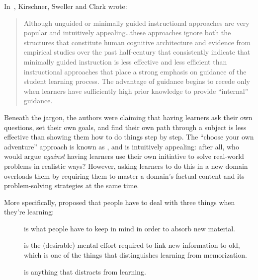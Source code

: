 
In~\cite{Kirs2006}, Kirschner, Sweller and Clark wrote:

\begin{quote}

  Although unguided or minimally guided instructional approaches
  are very popular and intuitively appealing{\ldots}these approaches ignore
  both the structures that constitute human cognitive architecture
  and evidence from empirical studies over the past half-century
  that consistently indicate that minimally guided instruction is less effective and less efficient
  than instructional approaches that place a strong emphasis on guidance of the student learning process.
  The advantage of guidance begins to recede
  only when learners have sufficiently high prior knowledge to provide ``internal'' guidance.

\end{quote}

Beneath the jargon,
the authors were claiming that having learners ask their own questions,
set their own goals,
and find their own path through a subject
is less effective than showing them how to do things step by step.
The ``choose your own adventure'' approach is known as ,
and is intuitively appealing:
after all,
who would argue \emph{against} having learners use their own initiative
to solve real-world problems in realistic ways?
However,
asking learners to do this in a new domain overloads them
by requiring them to master a domain's factual content
and its problem-solving strategies
at the same time.

More specifically,
 proposed that
people have to deal with three things when they're learning:

\begin{description}

\item[]
  is what people have to keep in mind in order to absorb new material.

\item[]
  is the (desirable) mental effort required to link new information to old,
  which is one of the things that distinguishes learning from memorization.

\item[]
  is anything that distracts from learning.

\end{description}

